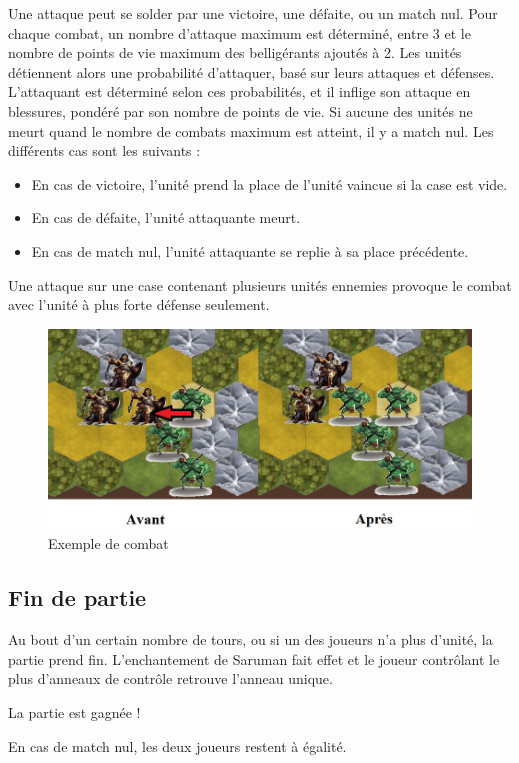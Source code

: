 Une attaque peut se solder par une victoire, une défaite, ou un match nul.
\newline
Pour chaque combat, un nombre d'attaque maximum est déterminé, entre 3 et le nombre de points de vie maximum des belligérants ajoutés à 2.
\newline
\newline
Les unités détiennent alors une probabilité d'attaquer, basé sur leurs attaques et défenses.
\newline
 L'attaquant est déterminé selon ces probabilités, et il inflige son attaque en blessures, pondéré par son nombre de points de vie.
\newline
Si aucune des unités ne meurt quand le nombre de combats maximum est atteint, il y a match nul.
\newline
\newline
 Les différents cas sont les suivants :
\begin{itemize}
\item En cas de victoire, l'unité prend la place de l'unité vaincue si la case est vide.
\item En cas de défaite, l'unité attaquante meurt.
\item En cas de match nul, l'unité attaquante se replie à sa place précédente.
\newline
\end{itemize}
Une attaque sur une case contenant plusieurs unités ennemies provoque le combat avec l'unité à plus forte défense seulement.
\begin{figure}[ht!]
\centering
\includegraphics[scale=0.50]{img/fincombat.jpg}
\caption{Exemple de combat}
\end{figure}

\newpage
\subsection{Fin de partie}

Au bout d'un certain nombre de tours, ou si un des joueurs n'a plus d'unité, la partie prend fin. 
\newline
L'enchantement de Saruman fait effet et le joueur contrôlant le plus d'anneaux de contrôle retrouve l'anneau unique. 
\newline
\begin{center}
La partie est gagnée !
\end{center}
\begin{center}
En cas de match nul, les deux joueurs restent à égalité.
\end{center}